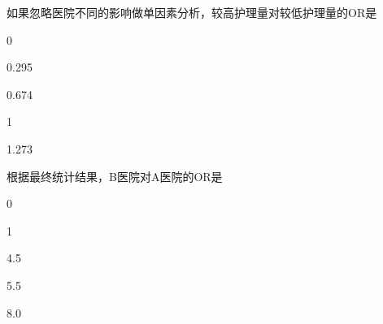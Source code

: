 \par\addvspace{8pt}\noindent\begin{minipage}{\linewidth}


如果忽略医院不同的影响做单因素分析，较高护理量对较低护理量的OR是


\begin{choices}

\item 0

\item 0.295

\item 0.674

\item 1

\item 1.273

\end{choices}

\end{minipage}\par\vspace{5pt}

\par\addvspace{8pt}\noindent\begin{minipage}{\linewidth}


根据最终统计结果，B医院对A医院的OR是


\begin{choices}

\item 0

\item 1

\item 4.5

\item 5.5

\item 8.0

\end{choices}

\end{minipage}\par\vspace{5pt}

